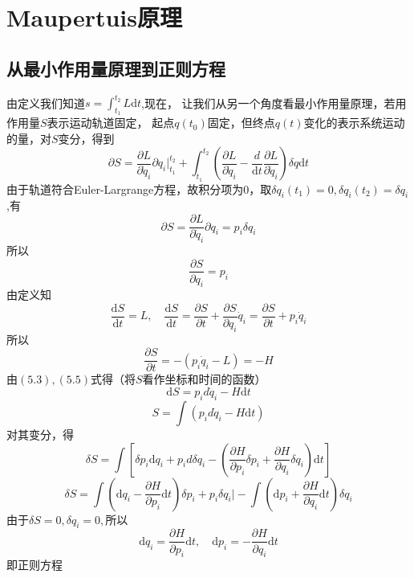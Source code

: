 \chapter{\rm Maupertuis原理}
\section{从最小作用量原理到正则方程}
由定义我们知道$\displaystyle{s=\int_{t_1}^{t_2}L\mathrm{d}t}$,现在，
让我们从另一个角度看最小作用量原理，若用作用量$S$表示运动轨道固定，
起点$q(t_0)$固定，但终点$q(t)$变化的表示系统运动的量，对$S$变分，得到
\begin{equation}
    \partial S=\frac{\partial L}{\partial\dot{q}_i}\partial q_i\Big|_{t_1}^{t_2}+\int_{t_1}^{t_2}
    \left(\frac{\partial L}{\partial\dot{q}_i}-\frac{d}{\mathrm{d}t}\frac{\partial L}{\partial\dot{q}_i}\right)\delta q\mathrm{d}t
\end{equation}
由于轨道符合Euler-Largrange方程，故积分项为0，取$\delta {q_i}(t_1)=0,\delta {q_i}(t_2)=\delta {q_i}$,有
\begin{equation}
    \partial S=\frac{\partial L}{\partial\dot{q}_i}\partial q_i=p_i\delta {q_i}
\end{equation}
所以
\begin{equation}
    \frac{\partial S}{\partial q_i}=p_i
\end{equation}
由定义知
\begin{equation}
    \frac{\mathrm{d}S}{\mathrm{d}t}=L,\quad \frac{\mathrm{d}S}{\mathrm{d}t}=\frac{\partial S}{\partial t}+\frac{\partial S}{\partial q_i}\dot{q}_i
    =\frac{\partial S}{\partial t}+p_i\dot{q}_i
\end{equation}
所以
\begin{equation}
    \frac{\partial S}{\partial t}=-(p_i\dot{q}_i-L)=-H
\end{equation}
由$(5.3),(5.5)$式得（将$S$看作坐标和时间的函数）
\begin{equation}
    \mathrm{d}S=p_id\dot{q}_i-H\mathrm{d}t
\end{equation}
\begin{equation}
    S=\int(p_id\dot{q}_i-H\mathrm{d}t)
\end{equation}
对其变分，得
\begin{equation}
    \delta S=\int\left[\delta p_i\mathrm{d}q_i+p_id\delta q_i-\left(\frac{\partial H}{\partial p_i}\delta p_i
    +\frac{\partial H}{\partial q_i}\delta q_i\right)\mathrm{d}t\right]
\end{equation}
\begin{equation}
    \delta S=\int\left(\mathrm{d}q_i-\frac{\partial H}{\partial p_i}\mathrm{d}t\right)\delta p_i+p_i\delta q_i\Big|
    -\int\left(\mathrm{d}p_i+\frac{\partial H}{\partial q_i}\mathrm{d}t\right)\delta q_i
\end{equation}
由于$\delta S=0,\delta q_i=0,$所以
\begin{equation}
    \mathrm{d}q_i=\frac{\partial H}{\partial p_i}\mathrm{d}t,\quad \mathrm{d}p_i=-\frac{\partial H}{\partial q_i}\mathrm{d}t
\end{equation}
即正则方程
